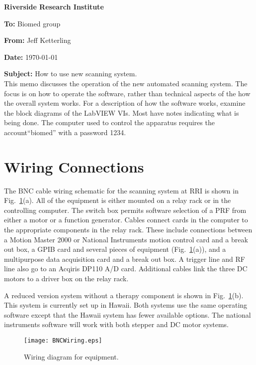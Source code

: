 \documentclass[10pt]{article}
\begin{document}
\begin{center}
 {\huge \bf Riverside Research Institute}
\end{center}

{\bf To:} Biomed group

{\bf From:} Jeff Ketterling

{\bf Date:} \today

{\bf Subject:} How to use new scanning system.
\\

This memo discusses the operation of the new automated scanning
system. The focus is on how to operate the software, rather than
technical aspects of the how the overall system works. For a
description of how the software works, examine the block diagrams
of the LabVIEW VIs. Most have notes indicating what is being done.
The computer used to control the apparatus requires the
account``biomed'' with a password 1234.

\section{Wiring Connections}

The BNC cable wiring schematic for the scanning system at RRI is
shown in Fig.~\ref{fig:BNCWires}(a). All of the equipment is
either mounted on a relay rack or in the controlling computer. The
switch box permits software selection of a PRF from either a motor
or a function generator. Cables connect cards in the computer to
the appropriate components in the relay rack. These include
connections between a Motion Master 2000 or National Instruments
motion control card and a break out box, a GPIB card and several
pieces of equipment (Fig.~\ref{fig:BNCWires}(a)), and a
multipurpose data acquisition card and a break out box. A trigger
line and RF line also go to an Acqiris DP110 A/D card. Additional
cables link the three DC motors to a driver box on the relay rack.

A reduced version system without a therapy component is shown in
Fig.~\ref{fig:BNCWires}(b). This system is currently set up in
Hawaii. Both systems use the same operating software except that
the Hawaii system has fewer available options. The national
instruments software will work with both stepper and DC motor
systems.


\begin{figure}[htb]
\begin{center}
\texttt{[image: BNCWiring.eps]}
 \caption{Wiring diagram for equipment.}
 \label{fig:BNCWires}
\end{center}
\end{figure}
\end{document}
